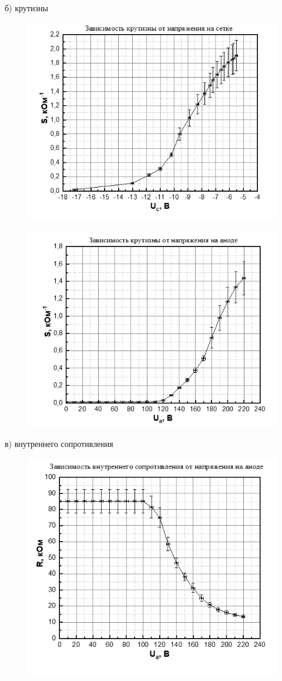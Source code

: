 б) крутизны
\begin{figure}[h!]
	\centering
	\includegraphics[width=0.7\linewidth]{fig/img11.png}
	\caption{}
	\label{fig:10}
\end{figure}

\begin{figure}[H]
	\centering
	\includegraphics[width=0.7\linewidth]{fig/img12.png}
	\caption{}
	\label{fig:10}
\end{figure}

в) внутреннего сопротивления
\begin{figure}[h!]
	\centering
	\includegraphics[width=0.7\linewidth]{fig/img21.png}
	\caption{}
	\label{fig:10}
\end{figure}

